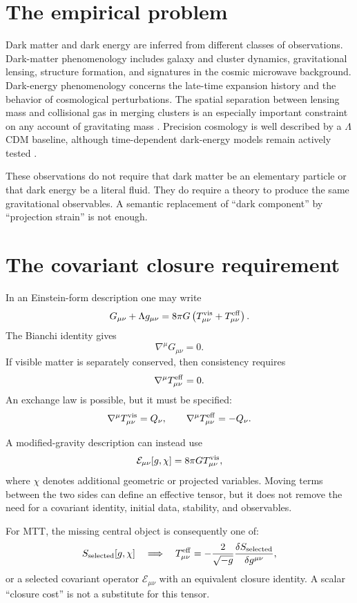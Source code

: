\documentclass[11pt]{article}
\begin{document}
\tableofcontents

\section{The empirical problem}

Dark matter and dark energy are inferred from different classes of
observations. Dark-matter phenomenology includes galaxy and cluster
dynamics, gravitational lensing, structure formation, and signatures in
the cosmic microwave background. Dark-energy phenomenology concerns the
late-time expansion history and the behavior of cosmological perturbations.
The spatial separation between lensing mass and collisional gas in merging
clusters is an especially important constraint on any account of gravitating
mass \cite{Clowe2006}. Precision cosmology is well described by a
\(\Lambda\)CDM baseline, although time-dependent dark-energy models remain
actively tested \cite{Planck2018,DESI2024}.

These observations do not require that dark matter be an elementary
particle or that dark energy be a literal fluid. They do require a theory to
produce the same gravitational observables. A semantic replacement of
``dark component'' by ``projection strain'' is not enough.

\section{The covariant closure requirement}

In an Einstein-form description one may write
\[
 G_{\mu\nu}+\Lambda g_{\mu\nu}
 =8\pi G\left(T^{\rm vis}_{\mu\nu}
              +T^{\rm eff}_{\mu\nu}\right).
\]
The Bianchi identity gives
\[
 \nabla^\mu G_{\mu\nu}=0.
\]
If visible matter is separately conserved, then consistency requires
\[
 \nabla^\mu T^{\rm eff}_{\mu\nu}=0.
\]
An exchange law is possible, but it must be specified:
\[
 \nabla^\mu T^{\rm vis}_{\mu\nu}=Q_\nu,
 \qquad
 \nabla^\mu T^{\rm eff}_{\mu\nu}=-Q_\nu.
\]

A modified-gravity description can instead use
\[
 \mathcal E_{\mu\nu}[g,\chi]
 =8\pi G T^{\rm vis}_{\mu\nu},
\]
where \(\chi\) denotes additional geometric or projected variables.
Moving terms between the two sides can define an effective tensor, but it
does not remove the need for a covariant identity, initial data, stability,
and observables.

For MTT, the missing central object is consequently one of:
\[
 S_{\rm selected}[g,\chi]
 \quad\Longrightarrow\quad
 T^{\rm eff}_{\mu\nu}
 =-\frac{2}{\sqrt{-g}}
   \frac{\delta S_{\rm selected}}{\delta g^{\mu\nu}},
\]
or a selected covariant operator \(\mathcal E_{\mu\nu}\) with an equivalent
closure identity. A scalar ``closure cost'' is not a substitute for this
tensor.
\end{document}
